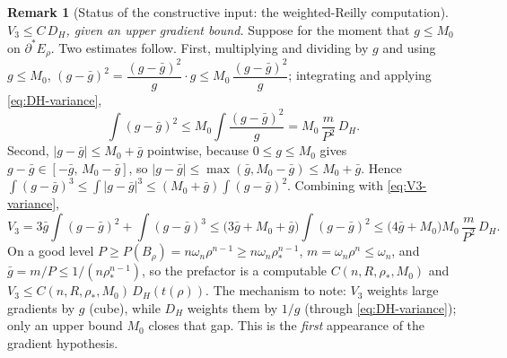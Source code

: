\documentclass[11pt]{amsart}
\theoremstyle{definition}
\newtheorem{remark}[theorem]{Remark}
\newcommand{\rstar}{\rho_*}
\newcommand{\Per}{P}
\begin{document}
\begin{remark}[Status of the constructive input: the weighted-Reilly computation]
\emph{\(V_3\le C\,D_H\), given an upper gradient bound.}  Suppose for the moment
that \(g\le M_0\) on \(\partial^*E_\rho\).  Two estimates follow.  First, multiplying and dividing by \(g\) and using
\(g\le M_0\),
\((g-\bar g)^2=\dfrac{(g-\bar g)^2}{g}\cdot g\le M_0\,\dfrac{(g-\bar g)^2}{g}\);
integrating and applying \eqref{eq:DH-variance},
\[
   \int(g-\bar g)^2\le M_0\int\frac{(g-\bar g)^2}{g}=M_0\,\frac{m}{P^2}\,D_H .
\]
Second, \(|g-\bar g|\le M_0+\bar g\) pointwise, because \(0\le g\le M_0\) gives
\(g-\bar g\in[-\bar g,\,M_0-\bar g]\), so \(|g-\bar g|\le\max(\bar g,M_0-\bar g)
\le M_0+\bar g\).  Hence \(\int(g-\bar g)^3\le\int|g-\bar g|^3
\le(M_0+\bar g)\int(g-\bar g)^2\).  Combining with \eqref{eq:V3-variance},
\begin{equation}\label{eq:V3-bound}
   V_3=3\bar g\!\int(g-\bar g)^2+\int(g-\bar g)^3
   \le\bigl(3\bar g+M_0+\bar g\bigr)\int(g-\bar g)^2
   \le\bigl(4\bar g+M_0\bigr)M_0\,\frac{m}{P^2}\,D_H .
\end{equation}
On a good level \(P\ge\Per(B_\rho)=n\omega_n\rho^{n-1}\ge n\omega_n\rstar^{n-1}\),
\(m=\omega_n\rho^n\le\omega_n\), and \(\bar g=m/P\le1/(n\rstar^{n-1})\), so the
prefactor is a computable \(C(n,R,\rstar,M_0)\) and
\(V_3\le C(n,R,\rstar,M_0)\,D_H(t(\rho))\).  The mechanism to note: \(V_3\)
weights large gradients by \(g\) (cube), while \(D_H\) weights them by \(1/g\)
(through \eqref{eq:DH-variance}); only an upper bound \(M_0\) closes that gap.
This is the \emph{first} appearance of the gradient hypothesis.


\end{remark}
\end{document}
